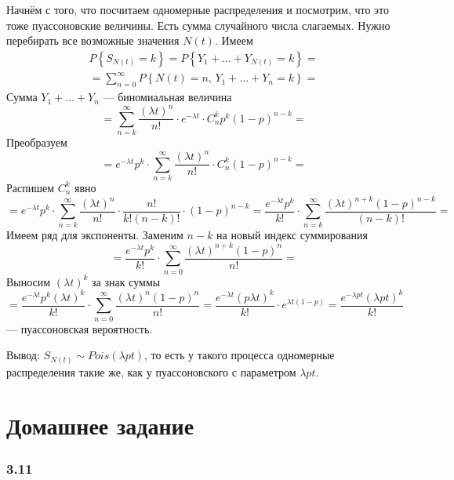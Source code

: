 Начнём с того, что посчитаем одномерные распределения и посмотрим,
что это тоже пуассоновские величины.
Есть сумма случайного числа слагаемых.
Нужно перебирать все возможные значения $N \left( t \right) $.
Имеем
\begin{gather*}
  P \left\{ S_{N \left( t \right) } = k \right\} =
  P \left\{ Y_1 + \dotsc + Y_{N \left( t \right) } = k \right\} = \\
  = \sum \limits_{n = 0}^{ \infty }
    P \left\{ N \left( t \right) = n, \, Y_1 + \dotsc + Y_n = k \right\} =
\end{gather*}
Сумма $Y_1 + \dotsc + Y_n $ --- биномиальная величина
$$= \sum \limits_{n = k}^{ \infty }
    \frac{ \left( \lambda t \right)^n}{n!} \cdot
    e^{-\lambda t} \cdot C_n^k p^k \left( 1 - p \right)^{n - k} =$$
Преобразуем
$$= e^{-\lambda t} p^k \cdot
  \sum \limits_{n = k}^{ \infty }
    \frac{ \left( \lambda t \right)^n}{n!} \cdot C_n^k \left( 1 - p \right)^{n - k} =$$
Распишем $C_n^k$ явно
$$= e^{-\lambda t} p^k \cdot
  \sum \limits_{n = k}^{ \infty }
    \frac{ \left( \lambda t \right)^n}{n!} \cdot
    \frac{n!}{k! \left( n - k \right)!} \cdot \left( 1 - p \right)^{n - k} =
  \frac{e^{-\lambda t} p^k}{k!} \cdot
  \sum \limits_{n = k}^{ \infty }
    \frac{ \left( \lambda t \right)^{n + k} \left( 1 - p \right)^{n - k}}{ \left( n - k \right)!} =$$
Имеем ряд для экспоненты.
Заменим $n - k$ на новый индекс суммирования
$$= \frac{e^{-\lambda t} p^k}{k!} \cdot
  \sum \limits_{n = 0}^{ \infty }
    \frac{ \left( \lambda t \right)^{n + k} \left( 1-  p \right)^n}{n!} =$$
Выносим $ \left( \lambda t \right)^k$ за знак суммы
$$= \frac{e^{-\lambda t} p^k \left( \lambda t \right)^k}{k!} \cdot
  \sum \limits_{n = 0}^{ \infty } \frac{ \left( \lambda t \right)^n \left( 1 - p \right)^n}{n!} =
  \frac{e^{-\lambda t} \left(p \lambda t \right)^k}{k!} \cdot e^{ \lambda t \left( 1 - p \right) } =
  \frac{e^{-\lambda pt} \left( \lambda pt \right)^k}{k!}$$
--- пуассоновская вероятность.

Вывод: $S_{N \left( t \right) } \sim Pois \left( \lambda pt \right) $,
то есть у такого процесса одномерные распределения такие же,
как у пуассоновского с параметром $ \lambda pt$.

\section*{Домашнее задание}

\subsubsection*{3.11}

